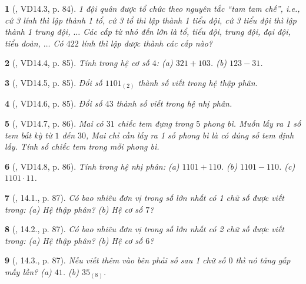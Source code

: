 \documentclass{article}
\newtheorem{baitoan}{}
\begin{document}
\begin{baitoan}[\cite{TLCT_THCS_Toan_6_so_hoc}, VD14.3, p. 84]
	1 đội quân được tổ chức theo nguyên tắc ``tam tam chế'', i.e., cứ 3 lính thì lập thành 1 tổ, cứ 3 tổ thì lập thành 1 tiểu đội, cứ 3 tiểu đội thì lập thành 1 trung đội, $\ldots$ Các cấp từ nhỏ đến lớn là tổ, tiểu đội, trung đội, đại đội, tiểu đoàn, $\ldots$ Có $422$ lính thì lập được thành các cấp nào?
\end{baitoan}

\begin{baitoan}[\cite{TLCT_THCS_Toan_6_so_hoc}, VD14.4, p. 85]
	Tính trong hệ cơ số $4$: (a) $321 + 103$. (b) $123 - 31$.
\end{baitoan}

\begin{baitoan}[\cite{TLCT_THCS_Toan_6_so_hoc}, VD14.5, p. 85]
	Đổi số $1101_{(2)}$ thành số viết trong hệ thập phân.
\end{baitoan}

\begin{baitoan}[\cite{TLCT_THCS_Toan_6_so_hoc}, VD14.6, p. 85]
	Đổi số $43$ thành số viết trong hệ nhị phân.
\end{baitoan}

\begin{baitoan}[\cite{TLCT_THCS_Toan_6_so_hoc}, VD14.7, p. 86]
	Mai có $31$ chiếc tem đựng trong $5$ phong bì. Muốn lấy ra 1 số tem bất kỳ từ $1$ đến $30$, Mai chỉ cần lấy ra 1 số phong bì là có đúng số tem định lấy. Tính số chiếc tem trong mỗi phong bì.
\end{baitoan}

\begin{baitoan}[\cite{TLCT_THCS_Toan_6_so_hoc}, VD14.8, p. 86]
	Tính trong hệ nhị phân: (a) $1101 + 110$. (b) $1101 - 110$. (c) $1101\cdot11$.
\end{baitoan}

\begin{baitoan}[\cite{TLCT_THCS_Toan_6_so_hoc}, 14.1., p. 87]
	Có bao nhiêu đơn vị trong số lớn nhất có 1 chữ số được viết trong: (a) Hệ thập phân? (b) Hệ cơ số $7$?
\end{baitoan}

\begin{baitoan}[\cite{TLCT_THCS_Toan_6_so_hoc}, 14.2., p. 87]
	Có bao nhiêu đơn vị trong số lớn nhất có 2 chữ số được viết trong: (a) Hệ thập phân? (b) Hệ cơ số $6$?
\end{baitoan}

\begin{baitoan}[\cite{TLCT_THCS_Toan_6_so_hoc}, 14.3., p. 87]
	Nếu viết thêm vào bên phải số sau 1 chữ số $0$ thì nó tăng gấp mấy lần? (a) $41$. (b) $35_{(8)}$.
\end{baitoan}
\end{document}
